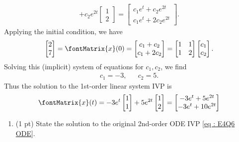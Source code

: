 {\begin{align}
+
c_{2} e^{2 t}
\begin{bmatrix}%
1	\\
2
\end{bmatrix}%
=
\begin{bmatrix}%
c_{1} e^{t} + c_{2} e^{2 t}	\\
c_{1} e^{t} + 2 c_{2} e^{2 t}
\end{bmatrix}%
.%
\label{eq : E4Q6 General Solution Matrix Form}
\end{align}
Applying the initial condition, we have
\begin{align*}
\begin{bmatrix}%
2	\\
7
\end{bmatrix}%
=
\fontMatrix{x}(0)
=
\begin{bmatrix}%
c_{1} + c_{2}	\\
c_{1} + 2 c_{2}
\end{bmatrix}%
=
\begin{bmatrix}%
1	&	1	\\
1	&	2
\end{bmatrix}%
\begin{bmatrix}%
c_{1}	\\
c_{2}
\end{bmatrix}%
.
\end{align*}
Solving this (implicit) system of equations for $c_{1},c_{2}$, we find
\begin{align*}
c_{1}
=
-3,
&&
c_{2}
=
5.
\end{align*}
Thus the solution to the 1st-order linear system IVP is
\begin{align*}
\fontMatrix{x}(t)
=
-3 e^{t}
\begin{bmatrix}%
1	\\
1
\end{bmatrix}%
+
5 e^{2 t}
\begin{bmatrix}%
1	\\
2
\end{bmatrix}%
=
\begin{bmatrix}%
-3 e^{t} + 5 e^{2 t}	\\
-3 e^{t} + 10 e^{2 t}
\end{bmatrix}%
\end{align*}}%



\begin{enumerate}[resume,label=(\alph*)]
\item\label{itm : E4Q6d} (1 pt) State the solution to the original 2nd-order ODE IVP \eqref{eq : E4Q6 ODE}. 
\end{enumerate}

